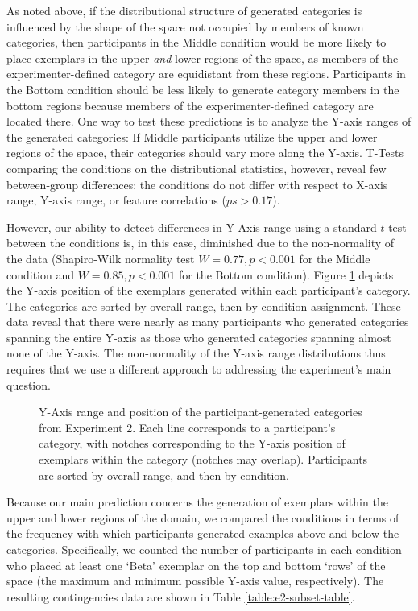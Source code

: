 \documentclass[12pt]{article}
\newcommand\inputpgf[2]{{
\let\pgfimageWithoutPath\pgfimage
\renewcommand{\pgfimage}[2][]{\pgfimageWithoutPath[##1]{#1/##2}}

}}
\begin{document}
\begin{flushleft}
As noted above, if the distributional structure of generated categories is
influenced by the shape of the space not occupied by members of known
categories, then participants in the Middle condition would be more likely to
place exemplars in the upper {\em and} lower regions of the space, as members of
the experimenter-defined category are equidistant from these regions.
Participants in the Bottom condition should be less likely to generate category
members in the bottom regions because members of the experimenter-defined
category are located there. One way to test these predictions is to analyze the
Y-axis ranges of the generated categories: If Middle participants utilize the
upper and lower regions of the space, their categories should vary more along
the Y-axis. T-Tests comparing the conditions on the distributional statistics,
however, reveal few between-group differences: the conditions do not differ with
respect to X-axis range, Y-axis range, or feature correlations ($ps>0.17$).

However, our ability to detect differences in Y-Axis range using a standard
$t$-test between the conditions is, in this case, diminished due to the
non-normality of the data (Shapiro-Wilk normality test $W=0.77, p< 0.001$ for
the Middle condition and $W=0.85, p < 0.001$ for the Bottom condition). Figure
\ref{fig:e2-yranges} depicts the Y-axis position of the exemplars generated
within each participant's category. The categories are sorted by overall range,
then by condition assignment. These data reveal that there were nearly as many
participants who generated categories spanning the entire Y-axis as those who
generated categories spanning almost none of the Y-axis. The non-normality of
the Y-axis range distributions thus requires that we use a different approach to
addressing the experiment's main question.

\begin{figure}
    \begin{center} \inputpgf{figs/}{e2-yranges.pgf}
    \caption{Y-Axis range and position of the participant-generated categories
from Experiment 2. Each line corresponds to a participant's category, with
notches corresponding to the Y-axis position of exemplars within the category
(notches may overlap). Participants are sorted by overall range, and then by
condition. }
    \label{fig:e2-yranges}
    \end{center}
\end{figure}

Because our main prediction concerns the generation of exemplars within the
upper and lower regions of the domain, we compared the conditions in terms of
the frequency with which participants generated examples above and below the
categories. Specifically, we counted the number of participants in each
condition who placed at least one `Beta' exemplar on the top and bottom `rows'
of the space (the maximum and minimum possible Y-axis value, respectively). The
resulting contingencies data are shown in Table \ref{table:e2-subset-table}.


\end{flushleft}
\end{document}
